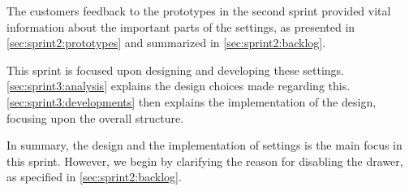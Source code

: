 The customers feedback to the prototypes in the second sprint provided vital information about the important parts of the settings, as presented in \cref{sec:sprint2:prototypes} and summarized in \cref{sec:sprint2:backlog}.

This sprint is focused upon designing and developing these settings.
\cref{sec:sprint3:analysis} explains the design choices made regarding this.
\cref{sec:sprint3:developments} then explains the implementation of the design, focusing upon the overall structure.

In summary, the design and the implementation of settings is the main focus in this sprint.
However, we begin by clarifying the reason for disabling the drawer, as specified in \cref{sec:sprint2:backlog}.